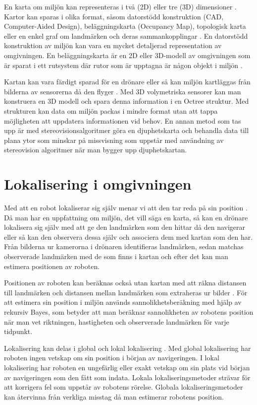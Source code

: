 En karta om miljön kan representeras i två (2D) eller tre (3D) dimensioner \citep{geospatial}. Kartor kan sparas i olika format, såsom datorstödd konstruktion (CAD, Computer-Aided Design), beläggningskarta (Occupancy Map), topologisk karta eller en enkel graf om landmärken och deras sammankopplingar \citep{982903}. En datorstödd konstruktion av miljön kan vara en mycket detaljerad representation av omgivningen. En beläggningskarta är en 2D eller 3D-modell av omgivningen som är sparat i ett rutsystem där rutor som är upptagna är någon objekt i miljön \citep{6095058, 982903}. 

Kartan kan vara färdigt sparad för en drönare eller så kan miljön kartläggas från bilderna av sensorerna då den flyger \citep{geospatial}. Med 3D volymetriska sensorer kan man konstruera en 3D modell och spara denna information i en Octree struktur. Med strukturen kan data om miljön packas i mindre format utan att tappa möjligheten att uppdatera informationen vid behov. En annan metod som tas upp är med stereovisionsalgoritmer göra en djuphetskarta och behandla data till plana ytor som minskar på missvisning som uppstår med användning av stereovision algoritmer när man bygger upp djuphetskartan.

\section{Lokalisering i omgivningen}

Med att en robot lokaliserar sig själv menar vi att den tar reda på sin position \citep{982903}. Då man har en uppfattning om miljön, det vill säga en karta, så kan en drönare lokalisera sig själv med att ge den landmärken som den hittar då den navigerar eller så kan den observera dessa själv och associera dem med kartan som den har. Från bilderna ur kamerorna i drönaren identifieras landmärken, sedan matchas observerade landmärken med de som finns i kartan och efter det kan man estimera positionen av roboten. 

Positionen av roboten kan beräknas också utan kartan med att räkna distansen till landmärken och distansen mellan landmärken som extraheras ur bilder \citep{realslamproblem}. För att estimera sin position i miljön används sannolikhetsberäkning med hjälp av rekursiv Bayes, som betyder att man beräknar sannolikheten av robotens position när man vet riktningen, hastigheten och observerade landmärken för varje tidpunkt. 

Lokalisering kan delas i global och lokal lokalisering \citep{982903, globalsubmaps}. Med global lokalisering har roboten ingen vetskap om sin position i början av navigeringen. I lokal lokalisering har roboten en ungefärlig eller exakt vetskap om sin plats vid början av navigeringen som den fått som indata. Lokala lokaliseringsmetoder strävar för att korrigera fel som uppstår av robotens rörelse. Globala lokaliseringsmetoder kan återvinna från verkliga misstag då man estimerar robotens position.


